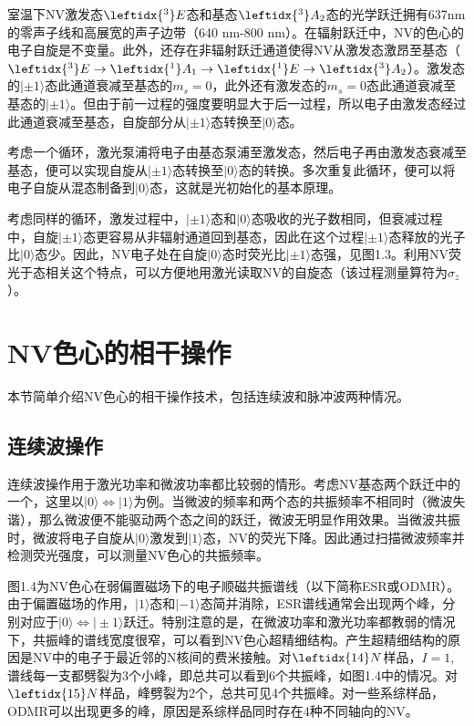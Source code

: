 室温下NV激发态$\leftidx{^3}E$态和基态$\leftidx{^3}A_2$态的光学跃迁拥有637nm的零声子线和高展宽的声子边带（640 nm-800 nm）。在辐射跃迁中，NV的色心的电子自旋是不变量。此外，还存在非辐射跃迁通道使得NV从激发态激昂至基态（$\leftidx{^3}E \rightarrow \leftidx{^1}A_1 \rightarrow  \leftidx{^1}E \rightarrow \leftidx{^3}A_2$）。激发态的$|\pm{1}\rangle$态此通道衰减至基态的$m_s=0$，此外还有激发态的$m_s=0$态此通道衰减至基态的$|\pm{1}\rangle$。但由于前一过程的强度要明显大于后一过程，所以电子由激发态经过此通道衰减至基态，自旋部分从$|\pm{1}\rangle$态转换至$|0\rangle$态。

考虑一个循环，激光泵浦将电子由基态泵浦至激发态，然后电子再由激发态衰减至基态，便可以实现自旋从$|\pm{1}\rangle$态转换至$|0\rangle$态的转换。多次重复此循环，便可以将电子自旋从混态制备到$|0\rangle$态，这就是光初始化的基本原理。

考虑同样的循环，激发过程中，$|\pm{1}\rangle$态和$|0\rangle$态吸收的光子数相同，但衰减过程中，自旋$|\pm{1}\rangle$态更容易从非辐射通道回到基态，因此在这个过程$|\pm{1}\rangle$态释放的光子比$|0\rangle$态少。因此，NV电子处在自旋$|0\rangle$态时荧光比$|\pm{1}\rangle$态强，见图1.3。利用NV荧光于态相关这个特点，可以方便地用激光读取NV的自旋态（该过程测量算符为$\sigma_z$）。

\section{NV色心的相干操作}

本节简单介绍NV色心的相干操作技术，包括连续波和脉冲波两种情况。

\subsection{连续波操作}

连续波操作用于激光功率和微波功率都比较弱的情形。考虑NV基态两个跃迁中的一个，这里以$|0\rangle \Longleftrightarrow |1\rangle$为例。当微波的频率和两个态的共振频率不相同时（微波失谐），那么微波便不能驱动两个态之间的跃迁，微波无明显作用效果。当微波共振时，微波将电子自旋从$|0\rangle$激发到$|1\rangle$态，NV的荧光下降。因此通过扫描微波频率并检测荧光强度，可以测量NV色心的共振频率。

图1.4为NV色心在弱偏置磁场下的电子顺磁共振谱线（以下简称ESR或ODMR）。由于偏置磁场的作用，$|1\rangle$态和$|-1\rangle$态简并消除，ESR谱线通常会出现两个峰，分别对应于$|0\rangle \Longleftrightarrow |\pm{1}\rangle$跃迁。特别注意的是，在微波功率和激光功率都教弱的情况下，共振峰的谱线宽度很窄，可以看到NV色心超精细结构。产生超精细结构的原因是NV中的电子于最近邻的N核间的费米接触。对$\leftidx{14}N$样品，$I=1$,谱线每一支都劈裂为3个小峰，即总共可以看到6个共振峰，如图1.4中的情况。对$\leftidx{15}N$样品，峰劈裂为2个，总共可见4个共振峰。对一些系综样品，ODMR可以出现更多的峰，原因是系综样品同时存在4种不同轴向的NV。

